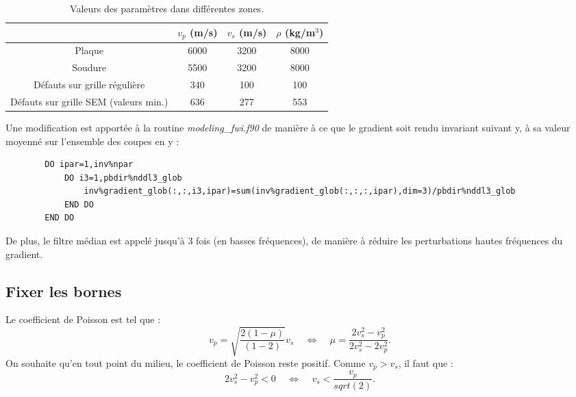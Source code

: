 \documentclass[a4paper,11pt]{report} %
\newenvironment{changemargin}[2]{\begin{list}{}{%
\setlength{\topsep}{0pt}%
\setlength{\leftmargin}{0pt}%
\setlength{\rightmargin}{0pt}%
\setlength{\listparindent}{\parindent}%
\setlength{\itemindent}{\parindent}%
\setlength{\parsep}{0pt plus 1pt}%
\addtolength{\leftmargin}{#1}%
\addtolength{\rightmargin}{#2}%
\setlength{\textwidth}{21cm}
}\item }{\end{list}}
\begin{document}
\begin{table}[!h]
	\centering
	\begin{tabular}{c || c | c | c}
										& $v_{p}$ (m/s) & $v_{s}$ (m/s) & $\rho$ (kg/m$^3$)\\ \hline \hline
								Plaque  & 6000  		& 3200 			& 8000 \\ \hline
								Soudure & 5500			& 3200 			& 8000 \\ \hline
		Défauts sur grille régulière 	& 340			& 100			& 100	\\ \hline
Défauts sur grille SEM 	(valeurs min.)	& 636			& 277			& 553 \\ 

	\end{tabular}
	\caption{Valeurs des paramètres dans différentes zones. \label{tab:milieux_vrais}}
\end{table}


Une modification est apportée à la routine \emph{modeling\_fwi.f90} de manière à ce que le gradient soit rendu invariant suivant y, à sa valeur moyenné sur l'ensemble des coupes en y : 

\begin{changemargin}{-2cm}{-2cm}
\noindent \begin{small}	
	\begin{verbatim}
	    DO ipar=1,inv%npar
	        DO i3=1,pbdir%nddl3_glob
	            inv%gradient_glob(:,:,i3,ipar)=sum(inv%gradient_glob(:,:,:,ipar),dim=3)/pbdir%nddl3_glob
	        END DO	 
	    END DO
	\end{verbatim}
\end{small}
\end{changemargin}

De plus, le filtre médian est appelé jusqu'à 3 fois (en basses fréquences), de manière à réduire les perturbations hautes fréquences du gradient.


\subsection{Fixer les bornes}
 
Le coefficient de Poisson est tel que : 
\begin{equation}
	v_{p} = \sqrt{\frac{2(1-\mu)}{(1-2)}} v_{s}~~~~~	\Leftrightarrow~~~~~  \mu = \frac{2v_{s}^2-v_{p}^2}{2v_{s}^2-2v_{p}^2}.
\end{equation}
On souhaite qu'en tout point du milieu, le coefficient de Poisson reste positif. Comme $v_{p}>v_{s}$, il faut que : 
\begin{equation}
	2v_{s}^2 - v_{p}^2 <0 ~~~~~\Leftrightarrow~~~~~ v_{s}< \frac{v_{p}}{sqrt(2)}. \label{poisson}
\end{equation}
\end{document}
